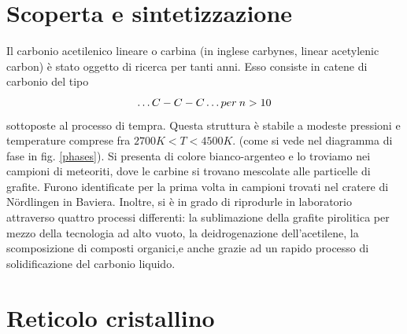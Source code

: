 \documentclass[a4paper,titlepage]{book}
\begin{document}
\section{Scoperta e sintetizzazione}
Il carbonio acetilenico lineare o carbina (in inglese carbynes, linear acetylenic carbon) è stato oggetto di ricerca per tanti anni. Esso consiste in catene di carbonio del tipo\\
\begin{equation}
	\dots C-C-C \dots per \: n>10\\
\end{equation} 
sottoposte al processo di tempra. Questa struttura è stabile a modeste pressioni e temperature comprese fra $2700 K< T < 4500 K$. (come si vede nel diagramma di fase in fig. \ref{phases}). Si presenta di colore bianco-argenteo e lo troviamo nei campioni di meteoriti, dove le carbine si trovano mescolate alle particelle di grafite. Furono identificate per la prima volta in campioni trovati nel cratere di Nördlingen in Baviera. Inoltre, si è in grado di riprodurle in laboratorio attraverso quattro processi differenti: la sublimazione della grafite pirolitica per mezzo della tecnologia ad alto vuoto, la deidrogenazione dell'acetilene, la scomposizione di composti organici,e anche grazie ad un rapido processo di solidificazione del carbonio liquido.  


\section {Reticolo cristallino}
\end{document}
